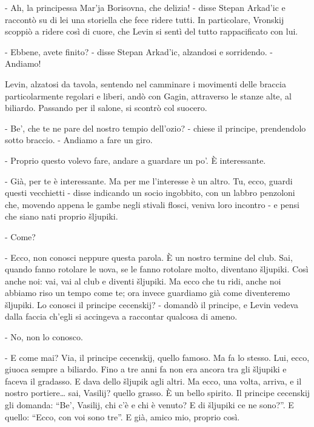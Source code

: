 - Ah, la principessa Mar'ja Borisovna, che delizia! - disse Stepan Arkad'ic e raccontò su di lei una storiella che fece ridere tutti. In particolare, Vronskij scoppiò a ridere così di cuore, che Levin si sentì del tutto rappacificato con lui. 

- Ebbene, avete finito? - disse Stepan Arkad'ic, alzandosi e sorridendo. - Andiamo! 

Levin, alzatosi da tavola, sentendo nel camminare i movimenti delle braccia particolarmente regolari e liberi, andò con Gagin, attraverso le stanze alte, al biliardo. Passando per il salone, si scontrò col suocero. 

- Be', che te ne pare del nostro tempio dell'ozio? - chiese il principe, prendendolo sotto braccio. - Andiamo a fare un giro. 

- Proprio questo volevo fare, andare a guardare un po'. È interessante. 

- Già, per te è interessante. Ma per me l'interesse è un altro. Tu, ecco, guardi questi vecchietti - disse indicando un socio ingobbito, con un labbro penzoloni che, movendo appena le gambe negli stivali flosci, veniva loro incontro - e pensi che siano nati proprio šljupiki. 

- Come? 

- Ecco, non conosci neppure questa parola. È un nostro termine del club. Sai, quando fanno rotolare le uova, se le fanno rotolare molto, diventano šljupiki. Così anche noi: vai, vai al club e diventi šljupiki. Ma ecco che tu ridi, anche noi abbiamo riso un tempo come te; ora invece guardiamo già come diventeremo šljupiki. Lo conosci il principe cecenskij? - domandò il principe, e Levin vedeva dalla faccia ch'egli si accingeva a raccontar qualcosa di ameno. 

- No, non lo conosco. 

- E come mai? Via, il principe cecenskij, quello famoso. Ma fa lo stesso. Lui, ecco, giuoca sempre a biliardo. Fino a tre anni fa non era ancora tra gli šljupiki e faceva il gradasso. E dava dello šljupik agli altri. Ma ecco, una volta, arriva, e il nostro portiere\ldots{} sai, Vasilij? quello grasso. È un bello spirito. Il principe cecenskij gli domanda: ``Be', Vasilij, chi c'è e chi è venuto? E di šljupiki ce ne sono?''. E quello: ``Ecco, con voi sono tre''. E già, amico mio, proprio così. 

